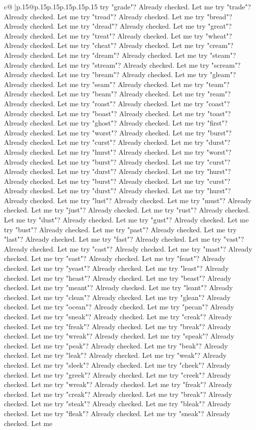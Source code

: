 \documentclass{article}
\begin{document}
{\begin{supertabular}{c@{$\;$}|p{.15\linewidth}@{}p{.15\linewidth}p{.15\linewidth}p{.15\linewidth}p{.15\linewidth}p{.15\linewidth}}
{{{try "grade"? Already checked. Let me try "trade"? Already checked. Let me try "tread"? Already checked. Let me try "bread"? Already checked. Let me try "dread"? Already checked. Let me try "great"? Already checked. Let me try "treat"? Already checked. Let me try "wheat"? Already checked. Let me try "cheat"? Already checked. Let me try "cream"? Already checked. Let me try "dream"? Already checked. Let me try "steam"? Already checked. Let me try "stream"? Already checked. Let me try "scream"? Already checked. Let me try "bream"? Already checked. Let me try "gleam"? Already checked. Let me try "seam"? Already checked. Let me try "team"? Already checked. Let me try "beam"? Already checked. Let me try "ream"? Already checked. Let me try "roast"? Already checked. Let me try "coast"? Already checked. Let me try "boast"? Already checked. Let me try "toast"? Already checked. Let me try "ghost"? Already checked. Let me try "first"? Already checked. Let me try "worst"? Already checked. Let me try "burst"? Already checked. Let me try "curst"? Already checked. Let me try "durst"? Already checked. Let me try "hurst"? Already checked. Let me try "worst"? Already checked. Let me try "burst"? Already checked. Let me try "curst"? Already checked. Let me try "durst"? Already checked. Let me try "hurst"? Already checked. Let me try "burst"? Already checked. Let me try "curst"? Already checked. Let me try "durst"? Already checked. Let me try "hurst"? Already checked. Let me try "lust"? Already checked. Let me try "must"? Already checked. Let me try "just"? Already checked. Let me try "rust"? Already checked. Let me try "dust"? Already checked. Let me try "gust"? Already checked. Let me try "bust"? Already checked. Let me try "past"? Already checked. Let me try "last"? Already checked. Let me try "fast"? Already checked. Let me try "vast"? Already checked. Let me try "cast"? Already checked. Let me try "mast"? Already checked. Let me try "east"? Already checked. Let me try "feast"? Already checked. Let me try "yeast"? Already checked. Let me try "least"? Already checked. Let me try "heast"? Already checked. Let me try "beast"? Already checked. Let me try "meant"? Already checked. Let me try "leant"? Already checked. Let me try "clean"? Already checked. Let me try "glean"? Already checked. Let me try "ocean"? Already checked. Let me try "pecan"? Already checked. Let me try "sneak"? Already checked. Let me try "creak"? Already checked. Let me try "freak"? Already checked. Let me try "break"? Already checked. Let me try "wreak"? Already checked. Let me try "speak"? Already checked. Let me try "peak"? Already checked. Let me try "beak"? Already checked. Let me try "leak"? Already checked. Let me try "weak"? Already checked. Let me try "sleek"? Already checked. Let me try "cheek"? Already checked. Let me try "greek"? Already checked. Let me try "creek"? Already checked. Let me try "wreak"? Already checked. Let me try "freak"? Already checked. Let me try "creak"? Already checked. Let me try "break"? Already checked. Let me try "steak"? Already checked. Let me try "bleak"? Already checked. Let me try "fleak"? Already checked. Let me try "sneak"? Already checked. Let me }}}
\end{supertabular}}
\end{document}
